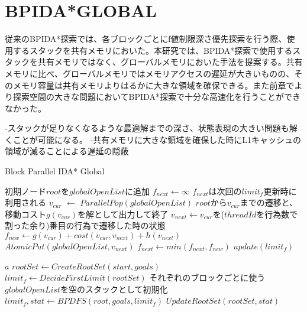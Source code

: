 \documentclass[a4paper,11pt,oneside,openany]{jsbook}
\begin{document}
\section{BPIDA*GLOBAL}
従来のBPIDA*探索\cite{HA17}では、各ブロックごとにf値制限深さ優先探索を行う際、使用するスタックを共有メモリにおいた。本研究では、BPIDA*探索で使用するスタックを共有メモリではなく、グローバルメモリにおいた手法を提案する。共有メモリに比べ、グローバルメモリではメモリアクセスの遅延が大きいものの、そのメモリ容量は共有メモリよりはるかに大きな領域を確保できる。また前章でより探索空間の大きな問題においてBPIDA*探索で十分な高速化を行うことができなかった。


-スタックが足りなくなるような最適解までの深さ、状態表現の大きい問題も解くことが可能になる。
-共有メモリに大きな領域を確保した時にL1キャッシュの領域が減ることによる遅延の隠蔽


\newpage
\begin{algorithm}
\caption{Block Parallel IDA* Global}
\label{alg:pbnf}
\begin{algorithmic}[1]
    \State 初期ノード$root$を$globalOpenList$に追加
    \State $f_{next} \leftarrow \infty$
    \State $f_{next}$は次回の$limit_f$更新時に利用される 
        \State $v_{cur}$ $\leftarrow$ ${ParallelPop}(globalOpenList)$
            \State $root$から$v_{cur}$までの遷移と、移動コスト$g(v_{cur})$を解として出力して終了
        \EndIf
        \State $v_{next} \gets $$v_{cur}$を($threadId$を行為数で割った余り)番目の行為で遷移した時の状態
        \State $f_{new} \leftarrow g(v_{cur}) + cost(v_{cur}, v_{next}) + h(v_{next})$
            \State ${AtomicPut}(globalOpenList, v_{next})$ 
        \Else
            \State $f_{next} \leftarrow min(f_{next}, f_{new})$
        \EndIf
    \EndWhile
    \State $update(limit_f)$

    \State \Return $a$
\EndFunction
{}
    \State $rootSet \gets {CreateRootSet}(start, goals)$
    \State $limit_f \leftarrow {DecideFirstLimit}(rootSet)$
    \State それぞれのブロックごとに使う$globalOpenList$を空のスタックとして初期化
            \State $limit_f, stat \gets {BPDFS}(root, goals, limit_f)$
        \EndParallelForByBlocks
        \State $UpdateRootSet(rootSet, stat)$
    \EndWhile
\EndFunction

\end{algorithmic}
\end{algorithm}
\newpage
\end{document}
